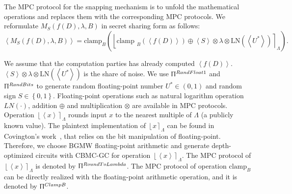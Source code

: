                   The MPC protocol for the snapping mechanism is to unfold the mathematical operations and replaces them with the corresponding MPC protocols. We reformulate $M_{S}\left(f\left(D\right),\lambda,B\right)$ in secret sharing form as follows:
                  \begin{equation}
                        \label{eq:snappingMPC}
                        \left\langle M_{S}\left(f\left(D\right) ,\lambda,B\right)\right\rangle =\text{clamp}_{B}\left(\left\lfloor\text {clamp }_{B}\left(\left\langle f\left(D\right)\right\rangle \right) \oplus \left\langle S\right\rangle \otimes \lambda\otimes \text{LN}\left(\left\langle U^{*}\right\rangle \right) \right\rceil_{\Lambda}\right).
                  \end{equation}

                  We assume that the computation parties has already computed $\left\langle f\left(D\right)\right\rangle$. $\left\langle S\right\rangle \otimes \lambda\otimes \text{LN}\left(\left\langle U^{*}\right\rangle \right)$ is the share of noise.
                  We use $\Uppi^{RandFloat1}$ and $\Uppi^{RandBits}$ to generate random floating-point number $ U^{*}\in \left(0,1\right)  $ and random sign $ S\in \left\{0,1\right\}$.
                  Floating-point operations such as natural logarithm operation $LN\left(\cdot\right) $, addition $\oplus$ and multiplication $\otimes$ are available in MPC protocols.
                  Operation $\left\lfloor \left\langle x\right\rangle \right\rceil_{\Lambda} $ rounds input $x$ to the nearest multiple of $\Lambda$ (a publicly known value).
                  The plaintext implementation of $\left\lfloor x\right\rceil_{\Lambda} $ can be found in Covington's work~\cite{Covington2019}, that relies on the bit manipulation of floating-point. Therefore, we choose BGMW floating-point arithmetic and generate depth-optimized circuits with CBMC-GC for operation $\left\lfloor \left\langle x\right\rangle \right\rceil_{\Lambda} $.
                  The MPC protocol of $\left\lfloor \left\langle x\right\rangle \right\rceil_{\Lambda} $ is denoted by $\Uppi^{RoundToLambda}$.
                  The MPC protocol of operation $\text{clamp}_{B}$ can be directly realized with the floating-point arithmetic operation, and it is denoted by $\Uppi^{ClampB}$.

